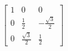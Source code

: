 \documentclass[preview]{standalone}
\begin{document}
\begin{align*}
\begin{bmatrix} 1 & 0 & 0 \\ 0 & \frac{1}{2} & -\frac{\sqrt{3}}{2} \\ 0 & \frac{\sqrt{3}}{2} & \frac{1}{2} \end{bmatrix}
\end{align*}
\end{document}
